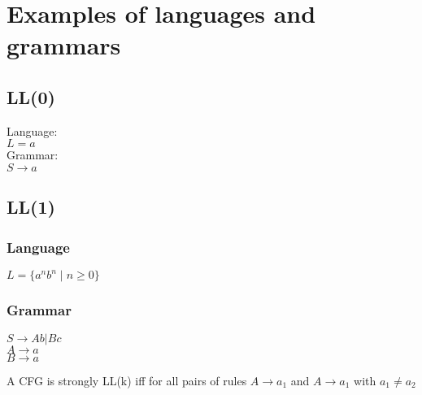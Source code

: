 \section{Examples of languages and grammars}

\subsection{LL(0)}
Language:\\
$ L = { a } $\\
Grammar:\\
$ S \rightarrow a $

\subsection{LL(1)}
\subsubsection{Language}
$ L = \{ a^nb^n \mid n \geq 0 \} $
\subsubsection{Grammar}
$S \rightarrow Ab | Bc$\\
$A \rightarrow a$ \\
$B \rightarrow a$



A CFG is strongly LL(k) iff for all pairs of rules $A \rightarrow a_1$ and $A \rightarrow a_1$ with $a_1 \neq a_2$


